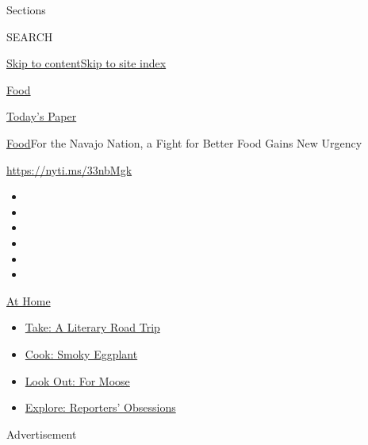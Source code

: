Sections

SEARCH

\protect\hyperlink{site-content}{Skip to
content}\protect\hyperlink{site-index}{Skip to site index}

\href{https://www.nytimes.com/section/food}{Food}

\href{https://myaccount.nytimes.com/auth/login?response_type=cookie\&client_id=vi}{}

\href{https://www.nytimes.com/section/todayspaper}{Today's Paper}

\href{/section/food}{Food}\textbar{}For the Navajo Nation, a Fight for
Better Food Gains New Urgency

\url{https://nyti.ms/33nbMgk}

\begin{itemize}
\item
\item
\item
\item
\item
\item
\end{itemize}

\href{https://www.nytimes.com/spotlight/at-home?action=click\&pgtype=Article\&state=default\&region=TOP_BANNER\&context=at_home_menu}{At
Home}

\begin{itemize}
\tightlist
\item
  \href{https://www.nytimes.com/2020/07/28/books/time-for-a-literary-road-trip.html?action=click\&pgtype=Article\&state=default\&region=TOP_BANNER\&context=at_home_menu}{Take:
  A Literary Road Trip}
\item
  \href{https://www.nytimes.com/2020/07/29/magazine/bored-with-your-home-cooking-some-smoky-eggplant-will-fix-that.html?action=click\&pgtype=Article\&state=default\&region=TOP_BANNER\&context=at_home_menu}{Cook:
  Smoky Eggplant}
\item
  \href{https://www.nytimes.com/2020/07/27/travel/moose-michigan-isle-royale.html?action=click\&pgtype=Article\&state=default\&region=TOP_BANNER\&context=at_home_menu}{Look
  Out: For Moose}
\item
  \href{https://www.nytimes.com/interactive/2020/at-home/even-more-reporters-editors-diaries-lists-recommendations.html?action=click\&pgtype=Article\&state=default\&region=TOP_BANNER\&context=at_home_menu}{Explore:
  Reporters' Obsessions}
\end{itemize}

Advertisement

